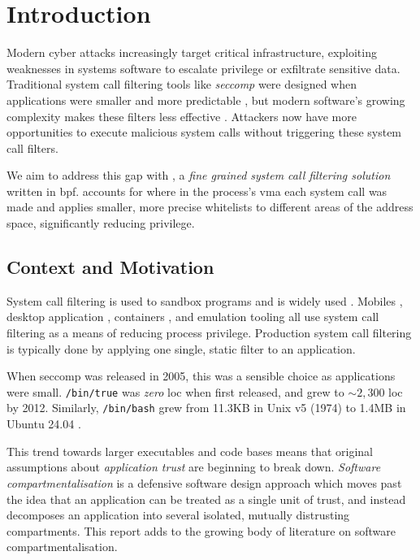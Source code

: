 \section{Introduction}

Modern cyber attacks increasingly target critical infrastructure, exploiting
weaknesses in systems software to escalate privilege or exfiltrate sensitive
data. Traditional system call filtering tools like \textit{seccomp} were designed when
applications were smaller and more predictable \cite{arcangeli_seccomp_2005, SYSFILTER}, but modern software's growing
complexity makes these filters less effective \cite{OPTIMUS}. Attackers now have more
opportunities to execute malicious system calls without triggering these system
call filters. 

We aim to address this gap with \af, a \textit{fine grained system call
filtering solution} written in \ac{bpf}. \af accounts for where in the process's \ac{vma} each
system call was made and applies smaller, more precise whitelists to
different areas of the address space, significantly reducing privilege.

\subsection{Context and Motivation}

System call filtering is used to sandbox programs and is widely used
\cite{BSIDE}. Mobiles \cite{android_seccomp_oreo},
desktop application \cite{flatpak_seccomp_profile}, containers \cite{docker_seccomp}, and emulation tooling all use system call
filtering as a means of reducing process privilege. Production system call
filtering is typically done by applying one single, static filter to an
application. 

When seccomp was released in 2005, this was a sensible choice as
applications were small. \texttt{/bin/true} was \textit{zero} \ac{loc} when
first released, and grew to $\sim2,300$ \ac{loc} by 2012. Similarly,
\texttt{/bin/bash} grew from 11.3KB in Unix v5 (1974) to 1.4MB in Ubuntu 24.04
\cite{SYSFILTER}.

This trend towards larger executables and code bases means that original
assumptions about \textit{application trust} are beginning to break down.
\textit{Software compartmentalisation} \cite{SOK} is a defensive software design approach
which moves past the idea that an application can be treated as a single unit of
trust, and instead decomposes an application into several isolated, mutually
distrusting compartments. This report adds to the growing body of literature on
software compartmentalisation.

